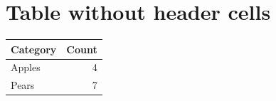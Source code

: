 \documentclass[11pt]{article}
\begin{document}
\section{Table without header cells}
\begin{tabular}{|l|r|}\hline
Category & Count \\\hline
Apples & 4 \\
Pears & 7 \\\hline
\end{tabular}
\end{document}
